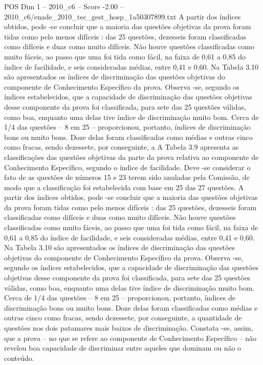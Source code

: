 \begin{textsample}{POS Dim 1 – 2010\_c6 – Score -2.00 – 2010\_c6/enade\_2010\_tec\_gest\_hosp\_1a50307899.txt}
A partir dos índices obtidos, pode -se concluir que a maioria das questões objetivas da prova foram tidas como pelo menos difíceis : das 25 questões, dezesseis foram classificadas como difíceis e duas como muito difíceis.
Não houve questões classificadas como muito fáceis, ao passo que uma foi tida como fácil, na faixa de 0,61 a 0,85 do índice de facilidade, e seis consideradas médias, entre 0,41 e 0,60.
Na Tabela 3.10 são apresentados os índices de discriminação das questões objetivas do componente de Conhecimento Específico da prova.
Observa -se, segundo os índices estabelecidos, que a capacidade de discriminação das questões objetivas desse componente da prova foi classificada, para sete das 25 questões válidas, como boa, enquanto uma delas tive índice de discriminação muito bom.
Cerca de 1/4 das questões – 8 em 25 – proporcionou, portanto, índices de discriminação bons ou muito bons.
Doze delas foram classificadas como médias e outras cinco como fracas, sendo dezessete, por conseguinte, a A Tabela 3.9 apresenta as classificações das questões objetivas da parte da prova relativa ao componente de Conhecimento Específico, segundo o índice de facilidade.
Deve -se considerar o fato de as questões de números 15 e 23 terem sido anuladas pela Comissão, de modo que a classificação foi estabelecida com base em 25 das 27 questões.
A partir dos índices obtidos, pode -se concluir que a maioria das questões objetivas da prova foram tidas como pelo menos difíceis : das 25 questões, dezesseis foram classificadas como difíceis e duas como muito difíceis.
Não houve questões classificadas como muito fáceis, ao passo que uma foi tida como fácil, na faixa de 0,61 a 0,85 do índice de facilidade, e seis consideradas médias, entre 0,41 e 0,60.
Na Tabela 3.10 são apresentados os índices de discriminação das questões objetivas do componente de Conhecimento Específico da prova.
Observa -se, segundo os índices estabelecidos, que a capacidade de discriminação das questões objetivas desse componente da prova foi classificada, para sete das 25 questões válidas, como boa, enquanto uma delas tive índice de discriminação muito bom.
Cerca de 1/4 das questões – 8 em 25 – proporcionou, portanto, índices de discriminação bons ou muito bons.
Doze delas foram classificadas como médias e outras cinco como fracas, sendo dezessete, por conseguinte, a quantidade de questões nos dois patamares mais baixos de discriminação.
Constata -se, assim, que a prova – no que se refere ao componente de Conhecimento Específico – não revelou boa capacidade de discriminar entre aqueles que dominam ou não o conteúdo.

\end{textsample}
